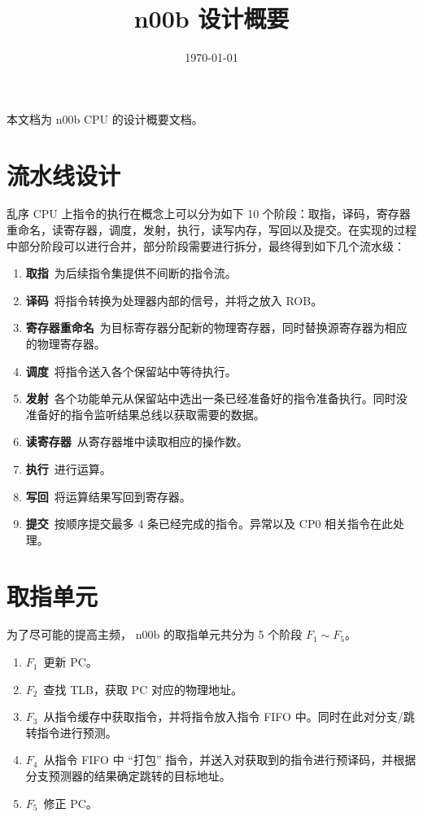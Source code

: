 \documentclass[blue,normal,cn]{elegantnote}
\title{n00b 设计概要}
\date{\today}
\begin{document}
\maketitle
	
本文档为 n00b CPU 的设计概要文档。

\section{流水线设计}

乱序 CPU 上指令的执行在概念上可以分为如下 10 个阶段：取指，译码，寄存器重命名，读寄存器，调度，发射，执行，读写内存，写回以及提交。在实现的过程中部分阶段可以进行合并，部分阶段需要进行拆分，最终得到如下几个流水级：
\begin{enumerate}
	\item \textbf{取指}\ 为后续指令集提供不间断的指令流。
	\item \textbf{译码}\ 将指令转换为处理器内部的信号，并将之放入 ROB。
	\item \textbf{寄存器重命名}\ 为目标寄存器分配新的物理寄存器，同时替换源寄存器为相应的物理寄存器。
	\item \textbf{调度}\ 将指令送入各个保留站中等待执行。
	\item \textbf{发射}\ 各个功能单元从保留站中选出一条已经准备好的指令准备执行。同时没准备好的指令监听结果总线以获取需要的数据。
	\item \textbf{读寄存器}\ 从寄存器堆中读取相应的操作数。
	\item \textbf{执行}\ 进行运算。
	\item \textbf{写回}\ 将运算结果写回到寄存器。
	\item \textbf{提交}\ 按顺序提交最多 4 条已经完成的指令。异常以及 CP0 相关指令在此处理。
\end{enumerate}

\section{取指单元}
为了尽可能的提高主频， n00b 的取指单元共分为 5 个阶段 $F_1 \sim F_5$。

\begin{enumerate}
	\item \textbf{$F_1$}\ 更新 PC。
	\item \textbf{$F_2$}\ 查找 TLB，获取 PC 对应的物理地址。
	\item \textbf{$F_3$}\ 从指令缓存中获取指令，并将指令放入指令 FIFO 中。同时在此对分支/跳转指令进行预测。
	\item \textbf{$F_4$}\ 从指令 FIFO 中 ``打包'' 指令，并送入对获取到的指令进行预译码，并根据分支预测器的结果确定跳转的目标地址。
	\item \textbf{$F_5$}\ 修正 PC。
\end{enumerate}
\end{document}

